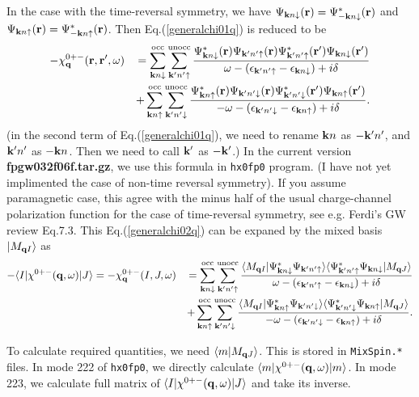 \documentclass[a4paper,10pt,epsf,fleqn]{article}
\newcommand{\bfq}{{\bf q}}
\newcommand{\bfk}{{\bf k}}
\newcommand{\bfr}{{\bf r}}
\newcommand{\ispone}{\downarrow}
\newcommand{\isptwo}{\uparrow}
\newcommand{\req}[1]{Eq.(\ref{#1})}
\begin{document}
In the case with the time-reversal symmetry, 
we have $\Psi_{\bfk n\ispone}(\bfr) = \Psi_{-\bfk n\ispone}^*(\bfr)$
and $\Psi_{\bfk n\isptwo}(\bfr) = \Psi_{-\bfk n\isptwo}^*(\bfr)$.
Then \req{generalchi01q} is reduced to be
\begin{eqnarray}
-\chi^{0+-}_\bfq(\bfr,\bfr',\omega) 
&&=
 \sum^{\rm occ}_{\bfk n \ispone} \sum^{\rm unocc}_{\bfk' n'\isptwo}
\frac{
\Psi_{\bfk n\ispone}^*(\bfr)      \Psi_{\bfk' n'\isptwo}(\bfr)
\Psi_{\bfk' n'\isptwo}^*(\bfr') \Psi_{\bfk n\ispone}(\bfr') 
}{\omega-(\epsilon_{\bfk' n'\isptwo}-\epsilon_{\bfk n\ispone})+i \delta} \nonumber\\
&&
+ \sum^{\rm occ}_{\bfk n \isptwo} \sum^{\rm unocc}_{\bfk' n'\ispone}
\frac{
\Psi_{\bfk n\isptwo}^*(\bfr)      \Psi_{\bfk' n'\ispone}(\bfr)
\Psi_{\bfk' n'\ispone}^*(\bfr') \Psi_{\bfk n\isptwo}(\bfr')}{-\omega-(\epsilon_{\bfk' n'\ispone}-\epsilon_{\bfk n\isptwo})+i \delta}.
\label{generalchi02q}
\end{eqnarray}
(in the second term of \req{generalchi01q}, 
we need to rename $\bfk n$ as $-\bfk' n'$, and $\bfk' n'$ as $-\bfk n$. Then 
we need to call $\bfk'$ as $-\bfk'$.) 
In the current version {\bf fpgw032f06f.tar.gz}, we use this formula in {\tt hx0fp0} program.
(I have not yet implimented the case of non-time reversal symmetry).
If you assume paramagnetic case, 
this agree with the minus half of the usual charge-channel polarization 
function for the case of time-reversal symmetry,
see e.g. Ferdi's GW review Eq.7.3.
This \req{generalchi02q} can be expaned by the mixed basis 
$|M_{\bfq I} \rangle$ as
\begin{eqnarray}
-\langle I|\chi^{0+-}(\bfq,\omega) | J \rangle=
-\chi^{0+-}_\bfq(I,J,\omega) 
&&=
 \sum^{\rm occ}_{\bfk n \ispone} \sum^{\rm unocc}_{\bfk' n'\isptwo}
\frac{
\langle M_{\bfq I} | \Psi_{\bfk n\ispone}^* \Psi_{\bfk' n'\isptwo} \rangle
\langle \Psi_{\bfk' n'\isptwo}^* \Psi_{\bfk n\ispone} | M_{\bfq J} \rangle
}{\omega-(\epsilon_{\bfk' n'\isptwo}-\epsilon_{\bfk n\ispone})+i \delta} \nonumber\\
&&
+ \sum^{\rm occ}_{\bfk n \isptwo} \sum^{\rm unocc}_{\bfk' n'\ispone}
\frac{
\langle M_{\bfq I} |\Psi_{\bfk n\isptwo}^* \Psi_{\bfk' n'\ispone} \rangle
\langle \Psi_{\bfk' n'\ispone}^* \Psi_{\bfk n\isptwo} | M_{\bfq J} \rangle }
{-\omega-(\epsilon_{\bfk' n'\ispone}-\epsilon_{\bfk n\isptwo})+i \delta}.
\label{generalchi03q}
\end{eqnarray}

To calculate required quantities,
we need $\langle m| M_{\bfq J} \rangle$. This is stored in {\tt MixSpin.*} files.
In mode 222 of {\tt hx0fp0}, we directly calculate $\langle m|\chi^{0+-}(\bfq,\omega) | m \rangle$.
In mode 223, we calculate full matrix of $\langle I|\chi^{0+-}(\bfq,\omega) | J \rangle$
and take its inverse.
\end{document}
